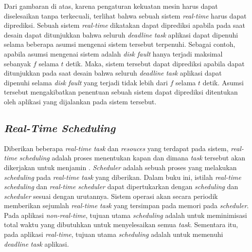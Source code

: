 Dari gambaran di atas, karena pengaturan kekuatan mesin harus dapat diselesaikan tanpa terkecuali, terlihat bahwa sebuah sistem \textit{real-time} harus dapat diprediksi.
Sebuah sistem \textit{real-time} dikatakan dapat diprediksi apabila pada saat desain dapat ditunjukkan bahwa seluruh \textit{deadline} \textit{task} aplikasi dapat dipenuhi selama beberapa asumsi mengenai sistem tersebut terpenuhi.
Sebagai contoh, apabila asumsi mengenai sistem adalah \textit{disk fault} hanya terjadi maksimal sebanyak $f$ selama $t$ detik.
Maka, sistem tersebut dapat diprediksi apabila dapat ditunjukkan pada saat desain bahwa seluruh \textit{deadline} \textit{task} aplikasi dapat dipenuhi selama \textit{disk fault} yang terjadi tidak lebih dari $f$ selama $t$ detik.
Asumsi tersebut mengakibatkan penentuan sebuah sistem dapat diprediksi ditentukan oleh aplikasi yang dijalankan pada sistem tersebut.

\subsection{\textit{Real-Time Scheduling}}

Diberikan beberapa \textit{real-time task} dan \textit{resouces} yang terdapat pada sistem, \textit{real-time scheduling} adalah proses menentukan kapan dan dimana \textit{task} tersebut akan dikerjakan untuk menjamin \cite[pp.~8-9]{Shin1994}.
\textit{Scheduler} adalah sebuah proses yang melakukan \textit{scheduling} pada \textit{real-time task} yang diberikan.
Dalam buku ini, istilah \textit{real-time scheduling} dan \textit{real-time scheduler} dapat dipertukarkan dengan \textit{scheduling} dan \textit{scheduler} sesuai dengan urutannya.
Sistem operasi akan secara periodik memberikan sejumlah \textit{real-time task} yang tersimpan pada memori pada \textit{scheduler}.
Pada aplikasi \textit{non-real-time}, tujuan utama \textit{scheduling} adalah untuk meminimisasi total waktu yang dibutuhkan untuk menyelesaikan semua \textit{task}.
Sementara itu, pada aplikasi \textit{real-time}, tujuan utama \textit{scheduling} adalah untuk memenuhi \textit{deadline} \textit{task} aplikasi.


